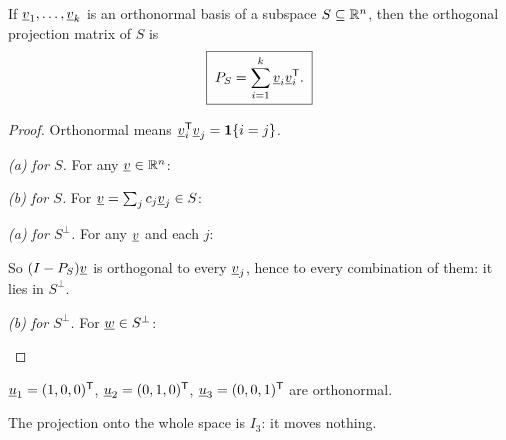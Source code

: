 \begin{theorem}
If $\underline{v}_1,\dots,\underline{v}_k$ is an orthonormal basis of a subspace $S\subseteq\mathbb{R}^n$, then the orthogonal projection matrix of $S$ is
\[
  \boxed{\;P_S=\sum_{i=1}^k\underline{v}_i\underline{v}_i^{\mathsf{T}}.\;}
\]
\end{theorem}
\begin{proof}
Orthonormal means $\underline{v}_i^{\mathsf{T}}\underline{v}_j=\mathbf{1}\{i=j\}$.
\begin{steps}
  \item \emph{(a) for $S$.} For any $\underline{v}\in\mathbb{R}^n$:
  \begin{deriv}
  \end{deriv}
  \item \emph{(b) for $S$.} For $\underline{v}=\sum_jc_j\underline{v}_j\in S$:
  \begin{deriv}
  \end{deriv}
  \item \emph{(a) for $S^\perp$.} For any $\underline{v}$ and each $j$:
  \begin{deriv}
  \end{deriv}
  So $(I-P_S)\underline{v}$ is orthogonal to every $\underline{v}_j$, hence to every combination of them: it lies in $S^\perp$.
  \item \emph{(b) for $S^\perp$.} For $\underline{w}\in S^\perp$:
  \begin{deriv}
  \end{deriv}
\end{steps}
\end{proof}

\begin{example}
$\underline{u}_1=(1,0,0)^{\mathsf{T}}$, $\underline{u}_2=(0,1,0)^{\mathsf{T}}$, $\underline{u}_3=(0,0,1)^{\mathsf{T}}$ are orthonormal.
\begin{deriv}
\end{deriv}
The projection onto the whole space is $I_3$: it moves nothing.
\end{example}

